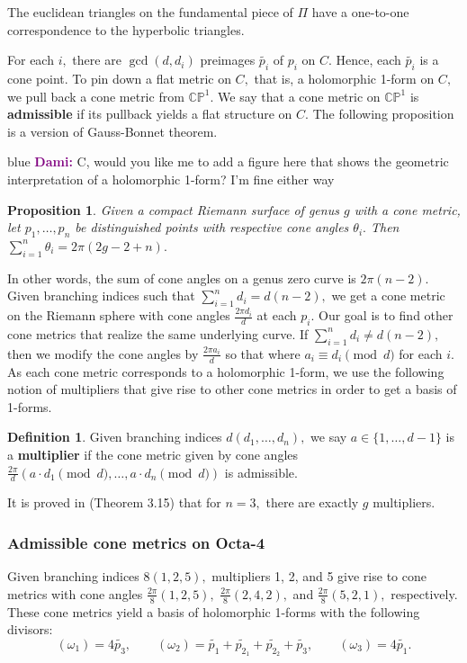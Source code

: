 \documentclass[12pt,reqno]{amsart}
\newenvironment{dami}{
  \medskip
\begin{color}{blue}
    \textcolor{purple}{\textbf{Dami:}} 
}{
\end{color}
  \medskip
}
\newtheorem*{proposition}{Proposition}
\theoremstyle{definition}
\newtheorem{defn}{Definition}
\theoremstyle{remark}
\begin{document}
The euclidean triangles on the fundamental piece of $\Pi$ have a one-to-one correspondence to the hyperbolic triangles.

For each $i,$ there are $\gcd(d, d_i)$ preimages $\widetilde{p_i}$ of $p_i$ on $C.$ Hence, each $\widetilde{p_i}$ is a cone point. To pin down a flat metric on $C,$ that is, a holomorphic 1-form on $C,$ we pull back a cone metric from $\mathbb{C}\mathbb{P}^1.$ We say that a cone metric on $\mathbb{C}\mathbb{P}^1$ is \textbf{admissible} if its pullback yields a flat structure on $C.$ The following proposition is a version of Gauss-Bonnet theorem.
\begin{dami} C, would you like me to add a figure here that shows the geometric interpretation of a holomorphic 1-form? I'm fine either way\end{dami}
\begin{proposition} Given a compact Riemann surface of genus $g$ with a cone metric, let $p_1, \ldots, p_n$ be distinguished points with respective cone angles $\theta_i.$ Then $\sum\limits_{i=1}^n \theta_i = 2 \pi (2 g - 2 + n).$
\end{proposition}


In other words, the sum of cone angles on a genus zero curve is $2 \pi (n - 2).$ Given branching indices such that $\sum\limits_{i=1}^n d_i = d (n - 2),$ we get a cone metric on the Riemann sphere with cone angles $\frac{2 \pi d_i}{d}$ at each $p_i.$ Our goal is to find other cone metrics that realize the same underlying curve. If $\sum\limits_{i=1}^n d_i \neq d (n - 2),$ then we modify the cone angles by $\frac{2 \pi a_i}{d}$ so that where $a_i \equiv d_i \pmod d$ for each $i.$ As each cone metric corresponds to a holomorphic 1-form, we use the following notion of multipliers that give rise to other cone metrics in order to get a basis of 1-forms.

\begin{defn} Given branching indices $d (d_1, \ldots , d_n),$ we say $a \in \{1, \ldots, d - 1\}$ is a \textbf{multiplier} if the cone metric given by cone angles $\frac{2 \pi}{d} (a \cdot d_1 \pmod d, \ldots , a \cdot d_n \pmod d)$ is admissible. 
\end{defn}

It is proved in \cite{dthesis} (Theorem 3.15) that for $n = 3,$ there are exactly $g$ multipliers. 

\subsubsection*{Admissible cone metrics on Octa-4} Given branching indices $8 (1, 2, 5),$ multipliers 1, 2, and 5 give rise to cone metrics with cone angles $\frac{2 \pi}{8}(1, 2, 5),$ $\frac{2 \pi}{8}(2, 4, 2),$ and $\frac{2 \pi}{8}(5, 2, 1),$ respectively. These cone metrics yield a basis of holomorphic 1-forms with the following divisors: $$(\omega_1) = 4 \widetilde{p_3}, \qquad (\omega_2) = \widetilde{p_1} + \widetilde{p_{2_1}} + \widetilde{p_{2_2}} + \widetilde{p_3}, \qquad (\omega_3) = 4 \widetilde{p_1}.$$
\end{document}

